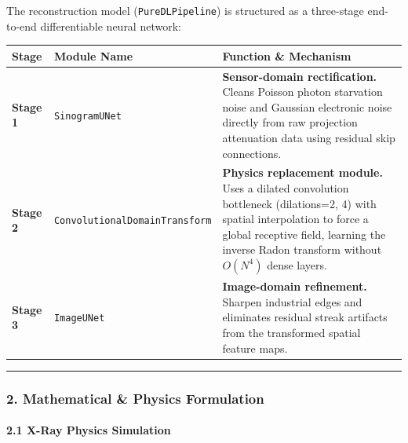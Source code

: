 \documentclass[
]{article}
\newcounter{none} %
\begin{document}
The reconstruction model (\texttt{PureDLPipeline}) is structured as a
three-stage end-to-end differentiable neural network:

{\def\LTcaptype{none} %
\begin{longtable}[]{@{}
  >{\raggedright\arraybackslash}p{}
  >{\raggedright\arraybackslash}p{}
  >{\raggedright\arraybackslash}p{}@{}}
\toprule\noalign{}
\begin{minipage}[b]{\linewidth}\raggedright
Stage
\end{minipage} & \begin{minipage}[b]{\linewidth}\raggedright
Module Name
\end{minipage} & \begin{minipage}[b]{\linewidth}\raggedright
Function \& Mechanism
\end{minipage} \\
\midrule\noalign{}
\endhead
\bottomrule\noalign{}
\endlastfoot
\textbf{Stage 1} & \texttt{SinogramUNet} & \textbf{Sensor-domain
rectification.} Cleans Poisson photon starvation noise and Gaussian
electronic noise directly from raw projection attenuation data using
residual skip connections. \\
\textbf{Stage 2} & \texttt{Convolutional}\newline\texttt{DomainTransform} &
\textbf{Physics replacement module.} Uses a dilated convolution
bottleneck (dilations=2, 4) with spatial interpolation to force a global
receptive field, learning the inverse Radon transform without \(O(N^4)\)
dense layers. \\
\textbf{Stage 3} & \texttt{ImageUNet} & \textbf{Image-domain
refinement.} Sharpen industrial edges and eliminates residual streak
artifacts from the transformed spatial feature maps. \\
\end{longtable}
}

\begin{center}\rule{0.5\linewidth}{0.5pt}\end{center}

\subsubsection{2. Mathematical \& Physics
Formulation}\label{mathematical-physics-formulation}

\paragraph{2.1 X-Ray Physics Simulation}\label{x-ray-physics-simulation}
\end{document}
